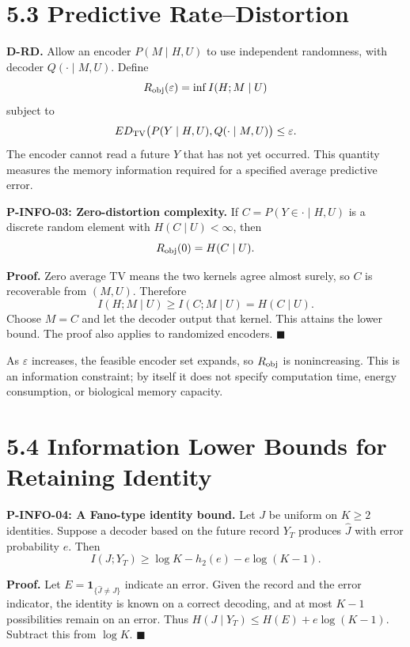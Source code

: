 \documentclass[
  english,
  11pt,
  oneside]{book}
\begin{document}
\section{5.3 Predictive Rate--Distortion}\label{predictive-ratedistortion}

\textbf{D-RD.} Allow an encoder \(P(M\mid H,U)\) to use independent randomness, with decoder \(Q(\cdot\mid M,U)\). Define \[R_{\rm obj}(\varepsilon)=
\inf I(H;M\mid U)\] subject to \[E D_{\rm TV}\bigl(P(Y\mid H,U),Q(\cdot\mid M,U)\bigr)
\le\varepsilon.\] The encoder cannot read a future \(Y\) that has not yet occurred. This quantity measures the memory information required for a specified average predictive error.

\hypertarget{p-info-03}{}\label{p-info-03}

\textbf{P-INFO-03: Zero-distortion complexity.} If \(C=P(Y\in\cdot\mid H,U)\) is a discrete random element with \(H(C\mid U)<\infty\), then \[R_{\rm obj}(0)=H(C\mid U).\]

\textbf{Proof.} Zero average TV means the two kernels agree almost surely, so \(C\) is recoverable from \((M,U)\). Therefore \[I(H;M\mid U)\ge I(C;M\mid U)=H(C\mid U).\] Choose \(M=C\) and let the decoder output that kernel. This attains the lower bound. The proof also applies to randomized encoders. \(\blacksquare\)

As \(\varepsilon\) increases, the feasible encoder set expands, so \(R_{\rm obj}\) is nonincreasing. This is an information constraint; by itself it does not specify computation time, energy consumption, or biological memory capacity.

\section{5.4 Information Lower Bounds for Retaining Identity}\label{information-lower-bounds-for-retaining-identity}

\hypertarget{p-info-04}{}\label{p-info-04}

\textbf{P-INFO-04: A Fano-type identity bound.} Let \(J\) be uniform on \(K\ge2\) identities. Suppose a decoder based on the future record \(Y_T\) produces \(\widehat J\) with error probability \(e\). Then \[I(J;Y_T)\ge\log K-h_2(e)-e\log(K-1).\]

\textbf{Proof.} Let \(E=\mathbf1_{\{\widehat J\ne J\}}\) indicate an error. Given the record and the error indicator, the identity is known on a correct decoding, and at most \(K-1\) possibilities remain on an error. Thus \(H(J\mid Y_T)\le H(E)+e\log(K-1)\). Subtract this from \(\log K\). \(\blacksquare\)
\end{document}
